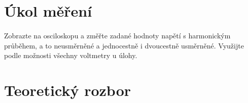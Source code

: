 \documentclass{praktikum}
\begin{document}
\maketitle
\vspace{0.5 cm}


\section{Úkol měření}
\paragraph{}
Zobrazte na osciloskopu a změřte zadané hodnoty napětí s harmonickým průběhem, a to neusměrněné a jednocestně i dvoucestně usměrněné. Využijte podle možnosti všechny voltmetry u úlohy.
\section{Teoretický rozbor}
\end{document}
